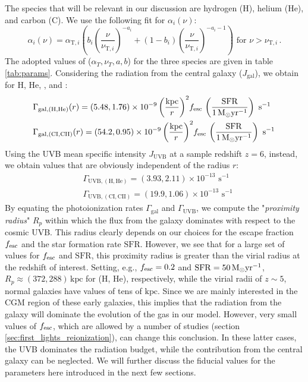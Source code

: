 The species that will be relevant in our discussion are hydrogen (H), helium (He), and carbon (C). We use the following fit for $\alpha_i(\nu)$: 
\begin{equation}
\alpha_i(\nu)=\alpha_{\mathrm{T},i}\left(b_i\left(\frac{\nu}{\nu_{\mathrm{T},i}}\right)^{-a_i}+(1-b_i)\left(\frac{\nu}{\nu_{\mathrm{T},i}}\right)^{-a_i-1}\right)\,\, \mathrm{for}\,\, \nu > \nu_{\mathrm{T},i}\,. \label{eq:crosssec}
\end{equation}
%
The adopted values of ($\alpha_T, \nu_T, a, b$) for the three species are given in table \ref{tab:params}. Considering the radiation from the central galaxy ($J_\mathrm{gal}$), we obtain for H, He, \CIion, and \CIIion:
\begin{subequations} \label{eq:ionization_states_gal}
\begin{align}
&\Gamma_{\mathrm{gal,(H,He)}}(r) = (5.48,1.76) \times 10^{-9} \, \bigg(\frac{\mathrm{kpc}}{r}\bigg)^2 f_{\rm esc} \,\left(\frac{\mathrm{SFR}}{1\,{\rm M}_{\odot}\mathrm{yr}^{-1}}\right) \,\, \mathrm{s}^{-1}\\
&\Gamma_{\mathrm{gal,(CI,CII)}}(r)=(54.2,0.95)\times 10^{-9}\, \bigg(\frac{\mathrm{kpc}}{r}\bigg)^2 f_{\rm esc}\,\left(\frac{\mathrm{SFR}}{1\,{\rm M}_{\odot}\mathrm{yr}^{-1}}\right) \,\, \mathrm{s}^{-1}\,
\end{align}
\end{subequations}
Using the UVB mean specific intensity $J_\mathrm{UVB}$ at a sample redshift $z=6$, instead, we obtain values that are obviously independent of the radius $r$:
\begin{subequations} \label{eq:ionization_states_uvb}
\begin{align}
&\Gamma_{\mathrm{UVB,(H,He)}} = (3.93,2.11) \times 10^{-13}\,\, \mathrm{s}^{-1}\\
&\Gamma_{\mathrm{UVB,(CI,CII)}} = (19.9,1.06) \times 10^{-13}\,\, \mathrm{s}^{-1}
\end{align}
\end{subequations}
By equating the photoionization rates $\Gamma_\mathrm{gal}$ and $\Gamma_{\mathrm{UVB}}$, we compute the "\textit{proximity radius}" $R_{p}$ within which the flux from the galaxy dominates with respect to the cosmic UVB. This radius clearly depends on our choices for the escape fraction $f_{\rm esc}$ and the star formation rate $\mathrm{SFR}$. However, we see that for a large set of values for $f_{\rm esc}$ and $\mathrm{SFR}$, this proximity radius is greater than the virial radius at the redshift of interest. Setting, e.g., $f_{\rm esc}=0.2$ and $\mathrm{SFR}=50\,{\rm M}_{\odot}\mathrm{yr^{-1}}$, $R_{p}\approx (372, 288)\, \mathrm{kpc}$ for (H, He), respectively, while the virial radii of $z\sim 5$, normal galaxies have values of tens of $\mathrm{kpc}$. Since we are mainly interested in the CGM region of these early galaxies, this implies that the radiation from the galaxy will dominate the evolution of the gas in our model. However, very small values of $f_{\rm esc}$, which are allowed by a number of studies (section \ref{sec:first_lights_reionization}), can change this conclusion. In these latter cases, the UVB dominates the radiation budget, while the contribution from the central galaxy can be neglected. We will further discuss the fiducial values for the parameters here introduced in the next few sections. 

